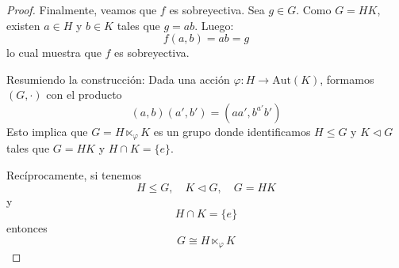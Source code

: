 \begin{proof}
Finalmente, veamos que $f$ es sobreyectiva.
Sea $g \in G$. Como $G = HK$, existen $a \in H$ y $b \in K$ tales que $g = ab$.
Luego:
\begin{equation*}
f(a,b) = ab = g
\end{equation*}
lo cual muestra que $f$ es sobreyectiva.

Resumiendo la construcción:
Dada una acción $\varphi: H \to \text{Aut}(K)$, formamos $(G, \cdot)$ con el producto
\begin{equation*}
(a,b)(a',b') = (aa', b^{a'}b')
\end{equation*}
Esto implica que $G = H \ltimes_{\varphi} K$ es un grupo donde identificamos $H \leq G$ y $K \triangleleft G$ tales que $G = HK$ y $H \cap K = \{e\}$.

Recíprocamente, si tenemos
\begin{equation*}
H \leq G, \quad K \triangleleft G, \quad G = HK
\end{equation*}
y
\begin{equation*}
H \cap K = \{e\}
\end{equation*}
entonces
\begin{equation*}
G \cong H \ltimes_{\varphi} K
\end{equation*}
\end{proof}

